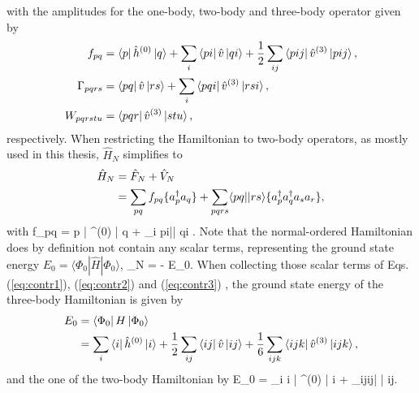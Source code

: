 with the amplitudes for the one-body, two-body and three-body operator given by
\begin{align}
f_{pq} &= \left\langle p \right|\hat{h}^{(0)}\left| q \right\rangle + \sum\limits_i \left\langle pi \right| \hat{v} \left| qi\right\rangle + \frac{1}{2}\sum\limits_{ij}\left\langle pij\right|\hat{v}^{(3)}\left| pij\right\rangle,\\
\Gamma_{pqrs} &= \left\langle pq \right| \hat{v} \left| r s \right\rangle + \sum\limits_i \left\langle p q i \right| \hat{v}^{(3)}\left| rsi \right\rangle,\\
W_{pqrstu} &=  \left\langle pqr\right|\hat{v}^{(3)}\left|stu\right\rangle,
\end{align}
respectively.
When restricting the Hamiltonian to two-body operators, as mostly used in this thesis, $\hat{H}_N$ simplifies to
\begin{align}
\hat{H}_N &= \hat{F}_N + \hat{V}_N \notag\\
&= \sum_{pq} f_{pq} \lbrace a^{\dagger}_p a_q \rbrace + \sum_{pqrs} \langle pq||rs\rangle \lbrace a^{\dagger}_p a^{\dagger}_q a_s a_r \rbrace,
\end{align} 
with
\be 
f_{pq} = \langle p | ^{(0)} | q \rangle + \sum_i \langle pi|| qi \rangle.
\ee
Note that the normal-ordered Hamiltonian does by definition not contain any scalar terms, representing the ground state energy $E_0 = \langle \Phi_0 | \hat{H}| \Phi_0 \rangle$,
\be 
{}_N =  - E_0.
\ee 
When collecting those scalar terms of Eqs. (\ref{eq:contr1}), (\ref{eq:contr2}) and (\ref{eq:contr3}) , the ground state energy 
of the three-body Hamiltonian is given by 
\begin{align}
E_0 &= \left\langle \Phi_0 \right| H \left| \Phi_0 \right\rangle \notag \\
&= \sum\limits_i \left\langle i \right| \hat{h}^{(0)} \left| i \right\rangle + \frac{1}{2}\sum\limits_{ij}\left\langle ij\right| \hat{v} \left| ij\right\rangle + \frac{1}{6}\sum\limits_{ijk}\left\langle ijk \right| \hat{v}^{(3)} \left| ijk \right\rangle,
\end{align}
and the one of the two-body Hamiltonian by
\be 
E_0 = \sum\limits_i \lla i \right| ^{(0)} \left| i \rra + \sum\limits_{ij}\lla ij\right|  \left| ij\rra.
\label{eq:tbenergy}
\ee
